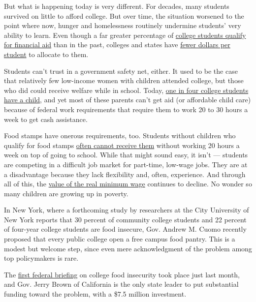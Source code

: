 But what is happening today is very different. For decades, many
students survived on little to afford college. But over time, the
situation worsened to the point where now, hunger and homelessness
routinely undermine students' very ability to learn. Even though a far
greater percentage of
\href{https://nces.ed.gov/fastfacts/display.asp?id=31}{college students
qualify for financial aid} than in the past, colleges and states have
\href{https://www.cbpp.org/research/state-budget-and-tax/a-lost-decade-in-higher-education-funding}{fewer
dollars per student} to allocate to them.

Students can't trust in a government safety net, either. It used to be
the case that relatively few low-income women with children attended
college, but those who did could receive welfare while in school. Today,
\href{https://iwpr.org/publications/4-8-million-college-students-are-raising-children/}{one
in four college students have a child,} and yet most of these parents
can't get aid (or affordable child care) because of federal work
requirements that require them to work 20 to 30 hours a week to get cash
assistance.

Food stamps have onerous requirements, too. Students without children
who qualify for food stamps
\href{https://www.fns.usda.gov/snap/facts-about-snap}{often cannot
receive them} without working 20 hours a week on top of going to school.
While that might sound easy, it isn't --- students are competing in a
difficult job market for part-time, low-wage jobs. They are at a
disadvantage because they lack flexibility and, often, experience. And
through all of this, the
\href{https://www.washingtonpost.com/news/wonk/wp/2017/12/29/the-u-s-has-one-of-the-stingiest-minimum-wage-policies-of-any-wealthy-nation/}{value
of the real minimum wage} continues to decline. No wonder so many
children are growing up in poverty.

In New York, where a forthcoming study by researchers at the City
University of New York reports that 30 percent of community college
students and 22 percent of four-year college students are food insecure,
Gov. Andrew M. Cuomo recently proposed that every public college open a
free campus food pantry. This is a modest but welcome step, since even
mere acknowledgment of the problem among top policymakers is rare.

The
\href{https://partnersforourchildren.org/blog/poc-co-sponsors-federal-briefing-about-food-insecurity-college-campuses}{first
federal briefing} on college food insecurity took place just last month,
and Gov. Jerry Brown of California is the only state leader to put
substantial funding toward the problem, with a \$7.5 million investment.

